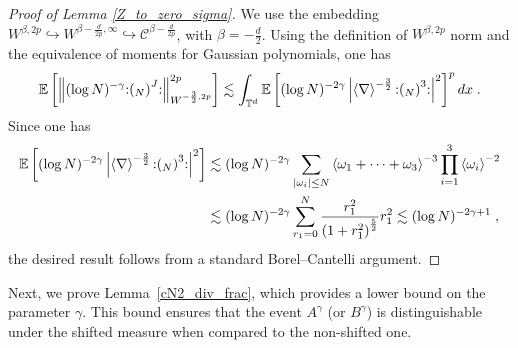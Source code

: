 \documentclass[a4paper,11pt]{article}
\makeatletter
\numberwithin{equation}{section}
\def\Wick#1{\mathopen{:}#1\mathclose{:}}
\newcommand{\EE}{\mathbb{E}}     %
\newcommand{\TT}{\mathbb{T}}
\newcommand{\cC}{\mathcal{C}}
\def\<#1>{\csname MH@symb@#1\endcsname}
\makeatother
\begin{document}
\begin{proof}[Proof of Lemma \ref{Z_to_zero_sigma}]
    We use the embedding $W^{\beta, 2p} \hookrightarrow W^{\beta - \frac{d}{2p}, \infty} \hookrightarrow \cC^{\beta - \frac{d}{2p}}$, with $\beta = -\frac{d}{2}$.
    Using the definition of $W^{\beta,2p}$ norm and the equivalence of moments for Gaussian polynomials, one has
    \begin{align*}
        \EE \left [ \left \lVert (\log N)^{-\gamma} \Wick{\left ( \<1>_N \right )^J} \right \rVert^{2p}_{W^{-\frac{3}{2}, 2p}} \right ] \lesssim \int_{\TT^d} \EE \left [ (\log N)^{-2\gamma} \left | \left \langle \nabla \right \rangle^{-\frac{3}{2}} \Wick{\left ( \<1>_N \right )^3} \right |^{2} \right ]^p dx\;.
    \end{align*}
 Since one has
    \begin{align*}
        \EE \left [ (\log N)^{-2\gamma} \left | \left \langle \nabla \right \rangle^{-\frac{3}{2}} \Wick{\left ( \<1>_N \right )^3} \right |^{2} \right ]
        &\lesssim (\log N)^{-2\gamma} \sum_{|\omega_i| \le N} \left \langle \omega_1 + \dots + \omega_3 \right \rangle^{-3} \prod_{i=1}^3 \left \langle \omega_i \right \rangle^{-2}\\
        &\lesssim (\log N)^{-2\gamma} \sum_{r_1=0}^N \frac{r_1^{2}}{\left ( 1+r_1^2\right )^{\frac{5}{2}}} r_1^{2}
        \lesssim (\log N)^{-2\gamma + 1}\;,
    \end{align*}
the desired result follows from a standard Borel--Cantelli argument.
\end{proof}
Next, we prove Lemma~\ref{cN2_div_frac}, which provides a lower bound on the parameter $\gamma$. This bound ensures that the event $A^\gamma$ (or $B^\gamma$) is distinguishable under the shifted measure when compared to the non-shifted one.
\end{document}

